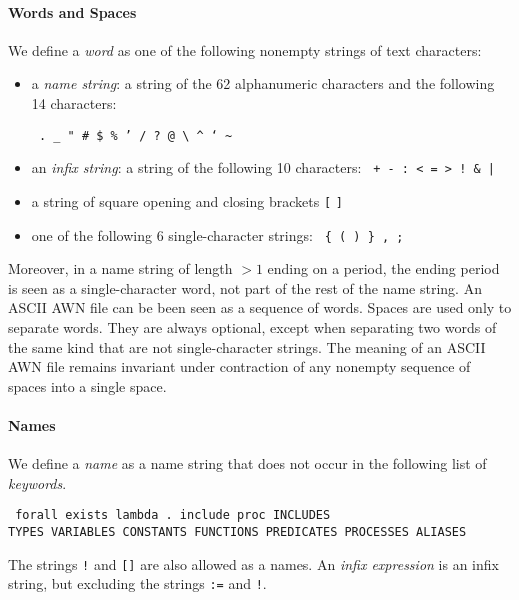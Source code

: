 \documentclass[adraft]{eptcs}
\begin{document}
\paragraph{Words and Spaces}
We define a \emph{word} as one of the following nonempty strings of text characters:
\begin{itemize}
\item a \emph{name string}: a string of the 62 alphanumeric characters
      and the following 14 characters:
\begin{center}\tt
 . \_ \;  " \; \#  \; \$  \; \%  \; '  \; /  \; ?  @  \; \textbackslash  \; \textasciicircum  \; ` \; \textasciitilde
\end{center}
\item an \emph{infix string}: a string of the following 10 characters:\; {\tt * \;  +  \; - \; : < \; =  \; > \; ! \& \; |}
\item a string of square opening and closing brackets \; {\tt [} \; {\tt ]}
\item one of the following 6 single-character strings: {\tt \; \{ \; ( \; ) \; \} \; , \; ;}
\end{itemize}
Moreover, in a name string of length $>1$ ending on a period, the ending period is seen as a single-character
  word, not part of the rest of the name string.
An ASCII AWN file can be been seen as a sequence of words.  Spaces are used only to separate words. They are always
optional, except when separating two words of the same kind that are not single-character strings.  The meaning of an
ASCII AWN file remains invariant under contraction of any nonempty sequence of spaces into a single space.

\paragraph{Names}
We define a \emph{name} as a name string that does not occur in the following list of \emph{keywords}.
\begin{center}\tt
forall \; exists \; lambda \; . include \; proc \; INCLUDES \\ TYPES \; VARIABLES \; CONSTANTS \;
FUNCTIONS \; PREDICATES \; PROCESSES \; ALIASES
\end{center}
The strings  {\tt !} and {\tt []} are also allowed as a names.
An \emph{infix expression} is an infix string,  but excluding the strings {\tt :=} and {\tt !}.
\end{document}
